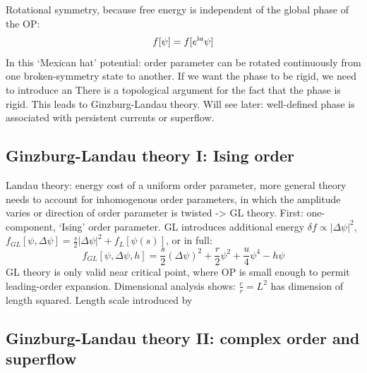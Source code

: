 \documentclass[../main.tex]{subfiles}
\begin{document}
Rotational symmetry, because free energy is independent of the global phase of the OP:
\begin{equation}
    f [\psi] = f [e^{\mathrm{i} a } \psi]
\end{equation}
In this `Mexican hat' potential: order parameter can be rotated continuously from one broken-symmetry state to another.
If we want the phase to be rigid, we need to introduce an
There is a topological argument for the fact that the phase is rigid.
This leads to Ginzburg-Landau theory.
Will see later: well-defined phase is associated with persistent currents or superflow.

\subsection{Ginzburg-Landau theory I: Ising order}

Landau theory: energy cost of a uniform order parameter, more general theory needs to account for inhomogenous order parameters, in which the amplitude varies or direction of order parameter is twisted -> GL theory.
First: one-component, `Ising' order parameter.
GL introduces additional energy \(\delta f \propto \vert \Delta \psi \vert^2\), \(f_{GL} [\psi, \Delta \psi] = \frac{s}{2} \vert \Delta \psi \vert^2 + f_L [\psi(s)]\), or in full:
\begin{equation}
    f_{GL} [\psi, \Delta \psi, h] = \frac{s}{2} (\Delta \psi)^2 + \frac{r}{2} \psi^2 + \frac{u}{4} \psi^4 - h \psi
\end{equation}
GL theory is only valid near critical point, where OP is small enough to permit leading-order expansion.
Dimensional analysis shows: \(\frac{c}{r} = L^2\)  has dimension of length squared.
Length scale introduced by


\subsection{Ginzburg-Landau theory II: complex order and superflow}
\end{document}

